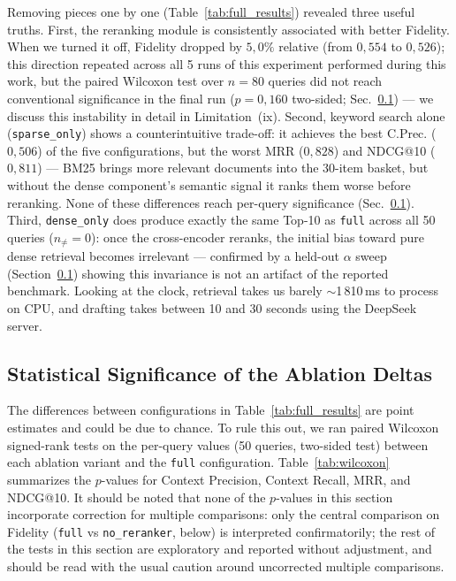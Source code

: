\documentclass[runningheads]{llncs}
\begin{document}
Removing pieces one by one (Table~\ref{tab:full_results}) revealed three useful truths. First, the reranking module is consistently associated with better Fidelity. When we turned it off, Fidelity dropped by $5{,}0\%$ relative (from $0{,}554$ to $0{,}526$); this direction repeated across all 5 runs of this experiment performed during this work, but the paired Wilcoxon test over $n{=}80$ queries did not reach conventional significance in the final run ($p{=}0{,}160$ two-sided; Sec.~\ref{sec:wilcoxon}) — we discuss this instability in detail in Limitation~(ix). Second, keyword search alone (\texttt{sparse\_only}) shows a counterintuitive trade-off: it achieves the best C.Prec. ($0{,}506$) of the five configurations, but the worst MRR ($0{,}828$) and NDCG@10 ($0{,}811$) — BM25 brings more relevant documents into the 30-item basket, but without the dense component's semantic signal it ranks them worse before reranking. None of these differences reach per-query significance (Sec.~\ref{sec:wilcoxon}). Third, \texttt{dense\_only} does produce exactly the same Top-10 as \texttt{full} across all 50 queries ($n_{\neq}{=}0$): once the cross-encoder reranks, the initial bias toward pure dense retrieval becomes irrelevant — confirmed by a held-out $\alpha$ sweep (Section~\ref{sec:wilcoxon}) showing this invariance is not an artifact of the reported benchmark. Looking at the clock, retrieval takes us barely $\sim$1\,810\,ms to process on CPU, and drafting takes between 10 and 30 seconds using the DeepSeek server.

\subsection{Statistical Significance of the Ablation Deltas}
\label{sec:wilcoxon}

The differences between configurations in Table~\ref{tab:full_results} are point estimates and could be due to chance. To rule this out, we ran paired Wilcoxon signed-rank tests on the per-query values (50 queries, two-sided test) between each ablation variant and the \texttt{full} configuration. Table~\ref{tab:wilcoxon} summarizes the $p$-values for Context Precision, Context Recall, MRR, and NDCG@10. It should be noted that none of the $p$-values in this section incorporate correction for multiple comparisons: only the central comparison on Fidelity (\texttt{full} vs \texttt{no\_reranker}, below) is interpreted confirmatorily; the rest of the tests in this section are exploratory and reported without adjustment, and should be read with the usual caution around uncorrected multiple comparisons.
\end{document}

